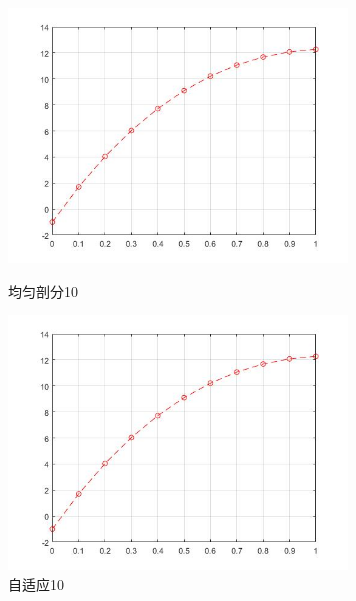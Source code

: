 \documentclass[12pt,fontset=mac]{ctexart}
\begin{document}
\begin{figure}[H]
	\centering
	\begin{minipage}[t]{0.48\textwidth}
		\centering
		\includegraphics[width=9cm]{方程三，均匀剖分10.jpg}
		\caption{均匀剖分10}
	\end{minipage}
	\begin{minipage}[t]{0.48\textwidth}
		\centering
		\includegraphics[width=9cm]{方程三，自适应10.jpg}
		\caption{自适应10}
	\end{minipage}
\end{figure}
\end{document}
